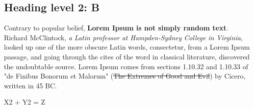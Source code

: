 \documentclass[11pt,a4paper]{article}
\begin{document}
\subsection{Heading level 2: B}

Contrary to popular belief, \textbf{Lorem Ipsum is not simply random text}. Richard McClintock, \textit{a Latin professor at Hampden-Sydney College in Virginia}, looked up one of the more obscure Latin words, consectetur, from a Lorem Ipsum passage, and going through the cites of the word in classical literature, discovered the undoubtable source. Lorem Ipsum comes from sections 1.10.32 and 1.10.33 of "de Finibus Bonorum et Malorum" (\sout{The Extremes of Good and Evil}) by Cicero, written in 45 BC.

X2 + Y2 = Z
\end{document}
